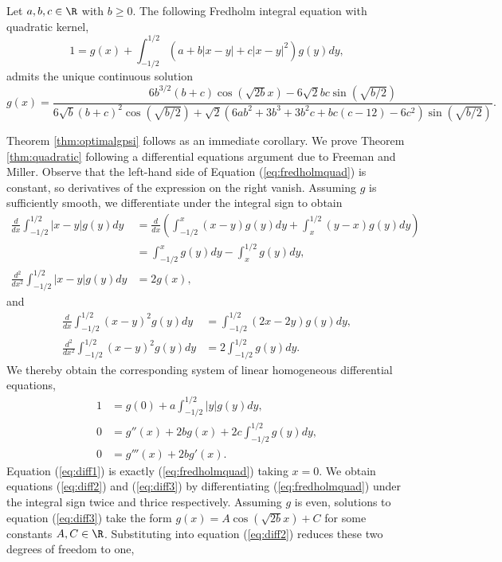 \begin{theorem}
	Let $a, b, c \in \R$ with $b \geq 0$. The following Fredholm integral equation with quadratic kernel,
		\begin{equation}
			1 = g(x) + \int_{-1/2}^{1/2} (a + b |x - y| + c |x - y|^2) g(y) dy, 	\label{eq:fredholmquad}
		\end{equation}
	admits the unique continuous solution
		\begin{equation}
			g(x) = \frac{6b^{3/2} (b + c) \cos(\sqrt{2b} x) - 6 \sqrt{2} b c \sin(\sqrt{b/2})}{6 \sqrt{b} (b + c)^2 \cos(\sqrt{b/2}) + \sqrt{2} (6 a b^2 + 3b^3 + 3b^2 c + b c (c - 12) - 6c^2) \sin (\sqrt{b/2})}. \label{eq:quadsol}
		\end{equation}\label{thm:quadratic}	
\end{theorem}

Theorem \ref{thm:optimalgpsi} follows as an immediate corollary. We prove Theorem \ref{thm:quadratic} following a differential equations argument due to Freeman and Miller. Observe that the left-hand side of Equation (\ref{eq:fredholmquad}) is constant, so derivatives of the expression on the right vanish. Assuming $g$ is sufficiently smooth, we differentiate under the integral sign to obtain
\begin{align*}
		\frac{d}{dx}  \int_{-1/2}^{1/2} |x - y| g(y) dy 
			&=\frac{d}{dx} \left( \int_{-1/2}^x (x - y) g(y) dy +  \int_x^{1/2} (y - x) g(y) dy \right)\\
			&= \int_{-1/2}^x g(y) dy - \int_x^{1/2} g(y) dy, \\
		\frac{d^2}{dx^2}  \int_{-1/2}^{1/2} |x - y| g(y) dy 
			&= 2g(x),
	\end{align*}
and
	\begin{align*}
		\frac{d}{dx} \int_{-1/2}^{1/2} (x - y)^2 g(y) dy
			&= \int_{-1/2}^{1/2} (2x - 2y) g(y) dy, \\
		\frac{d^2}{dx^2} \int_{-1/2}^{1/2} (x - y)^2 g(y) dy
			&= 2 \int_{-1/2}^{1/2} g(y) dy.
	\end{align*}
We thereby obtain the corresponding system of linear homogeneous differential equations,
	\begin{align}
		1
			&= g(0) + a \int_{-1/2}^{1/2} |y| g(y) dy, \label{eq:diff1}\\
		0 
			&= g'' (x) + 2b g(x) + 2c \int_{-1/2}^{1/2} g(y) dy, \label{eq:diff2} \\
		0
			&= g''' (x) + 2b g'(x).		\label{eq:diff3}	
	\end{align}
Equation (\ref{eq:diff1}) is exactly (\ref{eq:fredholmquad}) taking $x = 0$. We obtain equations (\ref{eq:diff2}) and (\ref{eq:diff3}) by differentiating (\ref{eq:fredholmquad}) under the integral sign twice and thrice respectively. Assuming $g$ is even, solutions to equation (\ref{eq:diff3}) take the form $g(x) = A \cos(\sqrt{2b} x) + C$ for some constants $A, C \in \R$. Substituting into equation (\ref{eq:diff2}) reduces these two degrees of freedom to one, 
